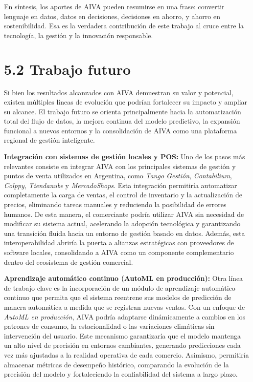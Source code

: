 En síntesis, los aportes de AIVA pueden resumirse en una frase: 
convertir lenguaje en datos, datos en decisiones, decisiones en ahorro, y ahorro en sostenibilidad. 
Esa es la verdadera contribución de este trabajo al cruce entre la tecnología, la gestión y la innovación responsable.


\section*{5.2 Trabajo futuro}

Si bien los resultados alcanzados con AIVA demuestran su valor y potencial, existen múltiples líneas de evolución que podrían fortalecer su impacto y ampliar su alcance. El trabajo futuro se orienta principalmente hacia la automatización total del flujo de datos, la mejora continua del modelo predictivo, la expansión funcional a nuevos entornos y la consolidación de AIVA como una plataforma regional de gestión inteligente.

\textbf{Integración con sistemas de gestión locales y POS:}  
Uno de los pasos más relevantes consiste en integrar AIVA con los principales sistemas de gestión y puntos de venta utilizados en Argentina, como \textit{Tango Gestión}, \textit{Contabilium}, \textit{Colppy}, \textit{Tiendanube} y \textit{MercadoShops}. Esta integración permitiría automatizar completamente la carga de ventas, el control de inventario y la actualización de precios, eliminando tareas manuales y reduciendo la posibilidad de errores humanos. De esta manera, el comerciante podría utilizar AIVA sin necesidad de modificar su sistema actual, acelerando la adopción tecnológica y garantizando una transición fluida hacia un entorno de gestión basado en datos. Además, esta interoperabilidad abriría la puerta a alianzas estratégicas con proveedores de software locales, consolidando a AIVA como un componente complementario dentro del ecosistema de gestión comercial.

\textbf{Aprendizaje automático continuo (AutoML en producción):}  
Otra línea de trabajo clave es la incorporación de un módulo de aprendizaje automático continuo que permita que el sistema reentrene sus modelos de predicción de manera automática a medida que se registran nuevas ventas. Con un enfoque de \textit{AutoML en producción}, AIVA podría adaptarse dinámicamente a cambios en los patrones de consumo, la estacionalidad o las variaciones climáticas sin intervención del usuario. Este mecanismo garantizaría que el modelo mantenga un alto nivel de precisión en entornos cambiantes, generando predicciones cada vez más ajustadas a la realidad operativa de cada comercio. Asimismo, permitiría almacenar métricas de desempeño histórico, comparando la evolución de la precisión del modelo y fortaleciendo la confiabilidad del sistema a largo plazo.

